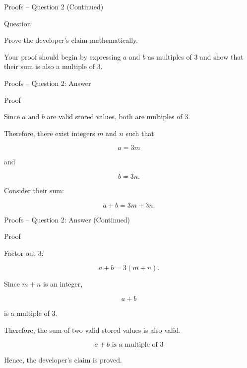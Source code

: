 
\begin{frame}{Proofs -- Question 2 (Continued)}

\begin{block}{Question}

Prove the developer's claim mathematically.

\medskip

Your proof should begin by expressing $a$ and $b$ as multiples of $3$ and
show that their sum is also a multiple of $3$.

\end{block}

\end{frame}


\begin{frame}{Proofs -- Question 2: Answer}

\begin{exampleblock}{Proof}

Since $a$ and $b$ are valid stored values, both are multiples of $3$.

Therefore, there exist integers $m$ and $n$ such that

\[
a=3m
\]

and

\[
b=3n.
\]

Consider their sum:

\[
a+b=3m+3n.
\]

\end{exampleblock}

\end{frame}


\begin{frame}{Proofs -- Question 2: Answer (Continued)}

\begin{exampleblock}{Proof}

Factor out $3$:

\[
a+b=3(m+n).
\]

Since $m+n$ is an integer,

\[
a+b
\]

is a multiple of $3$.

Therefore, the sum of two valid stored values is also valid.

\[
\boxed{a+b\text{ is a multiple of }3}
\]

Hence, the developer's claim is proved.

\end{exampleblock}

\end{frame}

